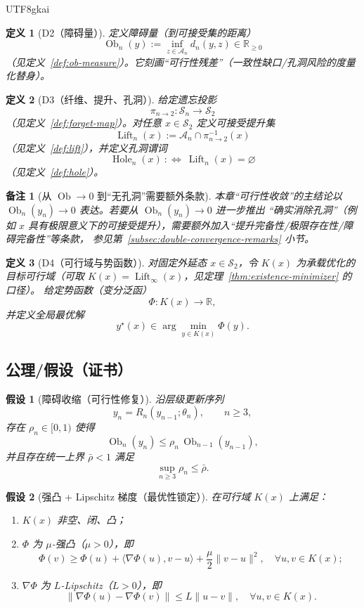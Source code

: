 \documentclass[12pt]{article}
\newtheorem{definition}{定义}[section]
\newtheorem{assumption}{假设}[section]
\newtheorem{remark}{备注}[section]
\newcommand{\Ob}{\operatorname{Ob}}
\newcommand{\Hole}{\operatorname{Hole}}
\newcommand{\Lift}{\operatorname{Lift}}
\begin{document}
\begin{CJK*}{UTF8}{gkai}
\begin{definition}[D2（障碍量）]\label{def:dc-D2}
定义障碍量（到可接受集的距离）
\[
\Ob_n(y):=\inf_{z\in\mathcal A_n} d_n(y,z)\in\mathbb R_{\ge 0}
\]
（见定义~\ref{def:ob-measure}）。它刻画“可行性残差”（一致性缺口/孔洞风险的度量化替身）。
\end{definition}

\begin{definition}[D3（纤维、提升、孔洞）]\label{def:dc-D3}
给定遗忘投影
\[
\pi_{n\to 2}:\mathcal S_n\to\mathcal S_2
\]
（见定义~\ref{def:forget-map}）。对任意 $x\in\mathcal S_2$ 定义可接受提升集
\[
\Lift_n(x):=\mathcal A_n\cap \pi_{n\to 2}^{-1}(x)
\]
（见定义~\ref{def:lift}），并定义孔洞谓词
\[
\Hole_n(x)\ :\iff\ \Lift_n(x)=\varnothing
\]
（见定义~\ref{def:hole}）。
\end{definition}

\begin{remark}[从 $\Ob\to 0$ 到“无孔洞”需要额外条款]
本章“可行性收敛”的主结论以 $\Ob_n(y_n)\to 0$ 表达。若要从 $\Ob_n(y_n)\to 0$ 进一步推出
“确实消除孔洞”（例如 $x$ 具有极限意义下的可接受提升），需要额外加入“提升完备性/极限存在性/障碍完备性”等条款，
参见第~\ref{subsec:double-convergence-remarks} 小节。
\end{remark}

\begin{definition}[D4（可行域与势函数）]\label{def:dc-D4}
对固定外延态 $x\in\mathcal S_2$，令 $K(x)$ 为承载优化的目标可行域（可取 $K(x)=\Lift_\infty(x)$，见定理~\ref{thm:existence-minimizer} 的口径）。
给定势函数（变分泛函）
\[
\Phi:K(x)\to\mathbb R,
\]
并定义全局最优解
\[
y^\star(x)\in \arg\min_{y\in K(x)}\Phi(y).
\]
\end{definition}

\subsection{公理/假设（证书）}
\label{subsec:double-convergence-assumptions}

\begin{assumption}[障碍收缩（可行性修复）]\label{ass:dc-ob-contract}
沿层级更新序列
\[
y_n = R_n(y_{n-1};\theta_n),\qquad n\ge 3,
\]
存在 $\rho_n\in[0,1)$ 使得
\[
\Ob_n(y_n)\le \rho_n\,\Ob_{n-1}(y_{n-1}),
\]
并且存在统一上界 $\bar\rho<1$ 满足
\[
\sup_{n\ge 3}\rho_n \le \bar\rho.
\]
\end{assumption}

\begin{assumption}[强凸 + Lipschitz 梯度（最优性锁定）]\label{ass:dc-opt-lock}
在可行域 $K(x)$ 上满足：
\begin{enumerate}
\item $K(x)$ 非空、闭、凸；
\item $\Phi$ 为 $\mu$-强凸（$\mu>0$），即
\[
\Phi(v)\ge \Phi(u)+\langle \nabla\Phi(u),v-u\rangle + \frac{\mu}{2}\|v-u\|^2,\quad \forall u,v\in K(x);
\]
\item $\nabla \Phi$ 为 $L$-Lipschitz（$L>0$），即
\[
\|\nabla\Phi(u)-\nabla\Phi(v)\|\le L\|u-v\|,\quad \forall u,v\in K(x).
\]
\end{enumerate}
\end{assumption}


\end{CJK*}
\end{document}
